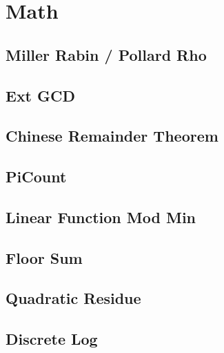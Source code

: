 \section{Math}
% 
\subsection{Miller Rabin / Pollard Rho}
\subsection{Ext GCD}
\subsection{Chinese Remainder Theorem}
\subsection{PiCount}
\subsection{Linear Function Mod Min} 
\subsection{Floor Sum}
\subsection{Quadratic Residue}
\subsection{Discrete Log}
